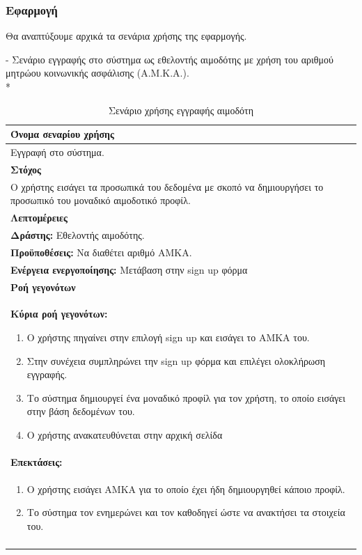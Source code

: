 
	\subsubsection{Εφαρμογή}
	
	Θα αναπτύξουμε αρχικά τα σενάρια χρήσης της εφαρμογής.
	
- Σενάριο εγγραφής στο σύστημα ως εθελοντής αιμοδότης με χρήση του αριθμού μητρώου κοινωνικής ασφάλισης (Α.Μ.Κ.Α.).
\\*
\begin{table}[H]
	\begin{center}
	    \begin{tabular}{|p{\dimexpr \linewidth-2\tabcolsep}|}
	    \hline
	    \rowcolor{grayy}
	    \textbf{Όνομα σεναρίου χρήσης}
	    \\ \hline    
	    Εγγραφή στο σύστημα.
	    \\ \hline
	    \rowcolor{grayy}
	    \textbf{Στόχος}
	    \\ \hline
	   Ο χρήστης εισάγει τα προσωπικά του δεδομένα με σκοπό να δημιουργήσει το προσωπικό του μοναδικό αιμοδοτικό προφίλ.
	    \\ \hline
	    \rowcolor{grayy}
	    \textbf{Λεπτομέρειες}
	    \\ \hline
		\textbf{Δράστης:} Εθελοντής αιμοδότης.
		\\*
		\textbf{Προϋποθέσεις:} Να διαθέτει αριθμό ΑΜΚΑ.
		\\*
		\textbf{Ενέργεια ενεργοποίησης:} Μετάβαση στην sign up φόρμα
		\\ \hline
		\rowcolor{grayy}    
	    \textbf{Ροή γεγονότων}
	    \\ \hline
		\textbf{Κύρια ροή γεγονότων:}
		\begin{enumerate}
			\item	Ο χρήστης πηγαίνει στην επιλογή sign up και εισάγει το ΑΜΚΑ του.
			\item Στην συνέχεια συμπληρώνει την sign up φόρμα και επιλέγει ολοκλήρωση εγγραφής.
			\item Το σύστημα δημιουργεί ένα μοναδικό προφίλ για τον χρήστη, το οποίο εισάγει στην βάση δεδομένων του.
			\item Ο χρήστης ανακατευθύνεται στην αρχική σελίδα 
		\end{enumerate}
		\\ \hline
		\rowcolor{grayy}
		\textbf{Επεκτάσεις:}
		\\ \hline 
		\begin{enumerate}
			\item	Ο χρήστης εισάγει ΑΜΚΑ για το οποίο έχει ήδη δημιουργηθεί κάποιο προφίλ.
			\item Το σύστημα τον ενημερώνει και τον καθοδηγεί ώστε να ανακτήσει τα στοιχεία του.
		\end{enumerate}
		\\*
		\\ \hline
	    \end{tabular}
	    \caption{Σενάριο χρήσης εγγραφής αιμοδότη}
		\label{tab:blood_donor_register}
	\end{center}
\end{table}

